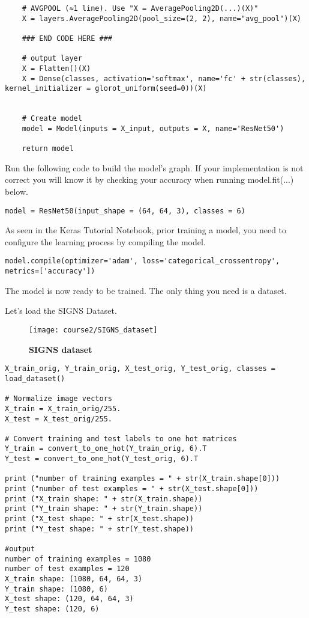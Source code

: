 \begin{verbatim}
    # AVGPOOL (≈1 line). Use "X = AveragePooling2D(...)(X)"
    X = layers.AveragePooling2D(pool_size=(2, 2), name="avg_pool")(X)
    
    ### END CODE HERE ###

    # output layer
    X = Flatten()(X)
    X = Dense(classes, activation='softmax', name='fc' + str(classes), kernel_initializer = glorot_uniform(seed=0))(X)
    
    
    # Create model
    model = Model(inputs = X_input, outputs = X, name='ResNet50')

    return model
\end{verbatim}

Run the following code to build the model's graph. If your implementation is not correct you will know it by checking your accuracy when running model.fit(...) below.
\begin{verbatim}
model = ResNet50(input_shape = (64, 64, 3), classes = 6)
\end{verbatim}

As seen in the Keras Tutorial Notebook, prior training a model, you need to configure the learning process by compiling the model.
\begin{verbatim}
model.compile(optimizer='adam', loss='categorical_crossentropy', metrics=['accuracy'])
\end{verbatim}

The model is now ready to be trained. The only thing you need is a dataset.

Let's load the SIGNS Dataset.
\begin{figure}[h]
\begin{center}
\texttt{[image: course2/SIGNS\_dataset]}
\caption{{\textbf{SIGNS dataset}}}
\end{center}
\end{figure}


\begin{verbatim}
X_train_orig, Y_train_orig, X_test_orig, Y_test_orig, classes = load_dataset()

# Normalize image vectors
X_train = X_train_orig/255.
X_test = X_test_orig/255.

# Convert training and test labels to one hot matrices
Y_train = convert_to_one_hot(Y_train_orig, 6).T
Y_test = convert_to_one_hot(Y_test_orig, 6).T

print ("number of training examples = " + str(X_train.shape[0]))
print ("number of test examples = " + str(X_test.shape[0]))
print ("X_train shape: " + str(X_train.shape))
print ("Y_train shape: " + str(Y_train.shape))
print ("X_test shape: " + str(X_test.shape))
print ("Y_test shape: " + str(Y_test.shape))

#output
number of training examples = 1080
number of test examples = 120
X_train shape: (1080, 64, 64, 3)
Y_train shape: (1080, 6)
X_test shape: (120, 64, 64, 3)
Y_test shape: (120, 6)
\end{verbatim}

